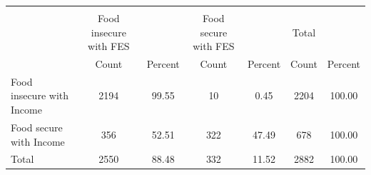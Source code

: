 {
\def\sym#1{\ifmmode^{#1}\else\(^{#1}\)\fi}
\begin{tabular}{l*{3}{cc}}
\hline\hline
            &\multicolumn{6}{c}{}                                                                           \\
            &Food insecure with FES&               &Food secure with FES&               &          Total&               \\
            &          Count&        Percent&          Count&        Percent&          Count&        Percent\\
\hline
Food insecure with Income&           2194&          99.55&             10&           0.45&           2204&         100.00\\
Food secure with Income&            356&          52.51&            322&          47.49&            678&         100.00\\
Total       &           2550&          88.48&            332&          11.52&           2882&         100.00\\
\hline\hline
\end{tabular}
}
